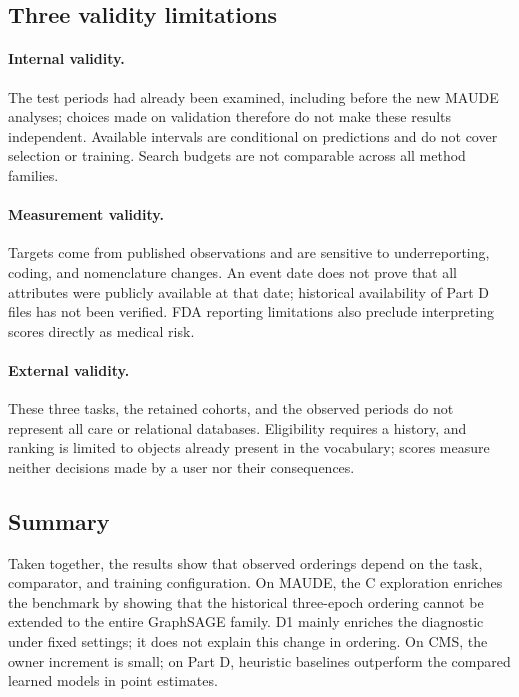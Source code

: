 \subsection{Three validity limitations}

\paragraph{Internal validity.} The test periods had already been examined, including before the new MAUDE analyses; choices made on validation therefore do not make these results independent. Available intervals are conditional on predictions and do not cover selection or training. Search budgets are not comparable across all method families.

\paragraph{Measurement validity.} Targets come from published observations and are sensitive to underreporting, coding, and nomenclature changes. An event date does not prove that all attributes were publicly available at that date; historical availability of Part D files has not been verified\cite{hgbresults}. FDA reporting limitations also preclude interpreting scores directly as medical risk\cite{fda2026}.

\paragraph{External validity.} These three tasks, the retained cohorts, and the observed periods do not represent all care or relational databases. Eligibility requires a history, and ranking is limited to objects already present in the vocabulary; scores measure neither decisions made by a user nor their consequences.

\subsection{Summary}

Taken together, the results show that observed orderings depend on the task, comparator, and training configuration. On MAUDE, the C exploration enriches the benchmark by showing that the historical three-epoch ordering cannot be extended to the entire GraphSAGE family. D1 mainly enriches the diagnostic under fixed settings; it does not explain this change in ordering. On CMS, the owner increment is small; on Part D, heuristic baselines outperform the compared learned models in point estimates.

